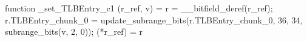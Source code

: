 function _set_TLBEntry_c1 (r_ref, v) = {
    r = __bitfield_deref(r_ref);
    r.TLBEntry_chunk_0 = update_subrange_bits(r.TLBEntry_chunk_0, 36, 34, subrange_bits(v, 2, 0));
    (*r_ref) = r
}
